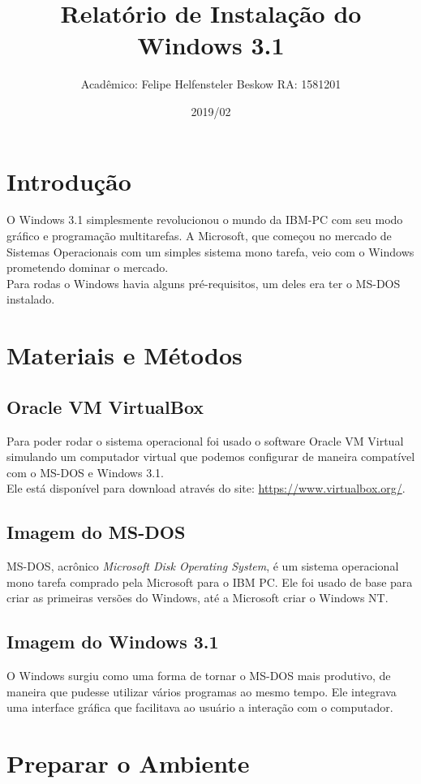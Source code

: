 \documentclass{report}
\title{Relatório de Instalação do Windows 3.1}
\author{Acadêmico: Felipe Helfensteler Beskow RA: 1581201}
\date{2019/02}
\begin{document}
\maketitle

\chapter{Introdução}
O Windows 3.1 simplesmente revolucionou o mundo da IBM-PC com seu modo gráfico e programação multitarefas. A Microsoft, que começou no mercado de Sistemas Operacionais com um simples sistema mono tarefa, veio com o Windows prometendo dominar o mercado. \\
Para rodas o Windows havia alguns pré-requisitos, um deles era ter o MS-DOS instalado.

\chapter{Materiais e Métodos}

\section{Oracle VM VirtualBox}
Para poder rodar o sistema operacional foi usado o software Oracle VM Virtual simulando um computador virtual que podemos configurar de maneira compatível com o MS-DOS e Windows 3.1.\\
Ele está disponível para download através do site: \url{https://www.virtualbox.org/}.

\section{Imagem do MS-DOS}
MS-DOS, acrônico \textit{Microsoft Disk Operating System}, é um sistema operacional mono tarefa comprado pela Microsoft para o IBM PC. Ele foi usado de base para criar as primeiras versões do Windows, até a Microsoft criar o Windows NT.

\section{Imagem do Windows 3.1}
O Windows surgiu como uma forma de tornar o MS-DOS mais produtivo, de maneira que pudesse utilizar vários programas ao mesmo tempo. Ele integrava uma interface gráfica que facilitava ao usuário a interação com o computador.

\chapter{Preparar o Ambiente}
\end{document}

